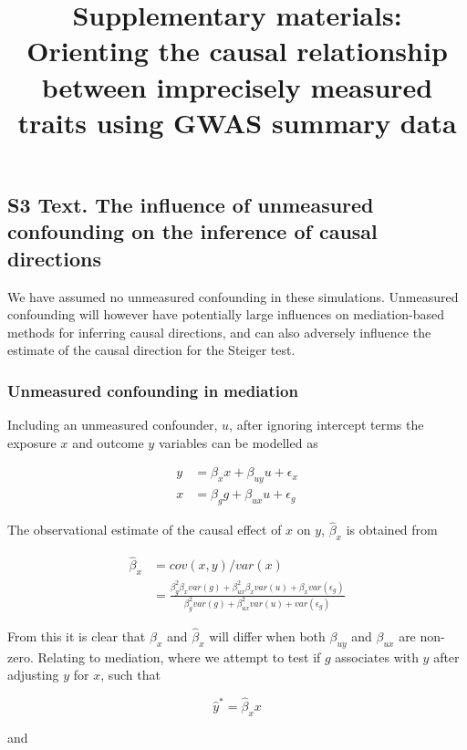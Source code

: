 \documentclass[]{article}
\title{Supplementary materials: Orienting the causal relationship between
imprecisely measured traits using GWAS summary data}
\author{}
\date{}
\begin{document}
\maketitle

\subsection{S3 Text. The influence of unmeasured confounding on the
inference of causal
directions}\label{s3-text.-the-influence-of-unmeasured-confounding-on-the-inference-of-causal-directions}

We have assumed no unmeasured confounding in these simulations.
Unmeasured confounding will however have potentially large influences on
mediation-based methods for inferring causal directions, and can also
adversely influence the estimate of the causal direction for the Steiger
test.

\subsubsection{Unmeasured confounding in
mediation}\label{unmeasured-confounding-in-mediation}

Including an unmeasured confounder, \(u\), after ignoring intercept
terms the exposure \(x\) and outcome \(y\) variables can be modelled as

\[
\begin{aligned}
y & = \beta_x x + \beta_{uy} u + \epsilon_x \\
x & = \beta_g g + \beta_{ux} u + \epsilon_g
\end{aligned}
\]

The observational estimate of the causal effect of \(x\) on \(y\),
\(\hat{\beta}_x\) is obtained from

\[
\begin{aligned}
\hat{\beta}_x & = cov(x, y) / var(x) \\
& = \frac{\beta_g^2 \beta_x var(g) + \beta_{ux}^2 \beta_x var(u) + \beta_x var(\epsilon_g)} {\beta_g^2 var(g) + \beta_{ux}^2 var(u) + var(\epsilon_g)}
\end{aligned}
\]

From this it is clear that \(\beta_x\) and \(\hat{\beta}_x\) will differ
when both \(\beta_{uy}\) and \(\beta_{ux}\) are non-zero. Relating to
mediation, where we attempt to test if \(g\) associates with \(y\) after
adjusting \(y\) for \(x\), such that

\[
\hat{y}^* = \hat{\beta}_x x
\]

and
\end{document}
